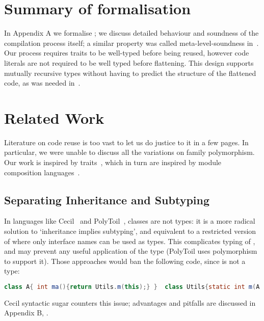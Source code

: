 \saveSpace
\section{Summary of formalisation}
\saveSpace
In Appendix A we formalise \name;  we 
discuss detailed behaviour and soundness
of the compilation process itself;
a similar property was called meta-level-soundness in~\cite{servetto2014meta}.
Our process requires traits to be well-typed before being reused,
however code literals are not required to be well typed before flattening.
This design supports mutually recursive types without having to
predict the structure of the flattened code, as was
needed in~\cite{deep}.

\saveSpace
\section{Related Work}
\saveSpace
Literature on code reuse is too vast to let us do justice to it in a few pages.
In particular, we were unable to discuss all the variations on family polymorphism.
Our work is inspired by traits~\cite{ducasse2006traits}, which in turn
are inspired by module composition languages~\cite{ancona2002calculus}.

\subsection{Separating Inheritance and Subtyping}
In languages like Cecil~\cite{chambers1995typechecking} and PolyToil~\cite{bruce1995polytoil},
classes are not types: it is a more radical solution to `inheritance implies subtyping', and equivalent to a restricted version of \name where only interface names can be used as types.
This complicates typing of \Q@this@,
and may prevent any useful application of the \Q@This@ type (PolyToil uses polymorphism to support it).
Those approaches would ban the following code,
since \Q@A@ is not a type:
\saveSpace\saveSpace\begin{lstlisting}[language=Java]
class A{ int ma(){return Utils.m(this);} }  class Utils{static int m(A a){..}}
\end{lstlisting}\saveSpace\saveSpace
Cecil syntactic sugar counters this issue; advantages and pitfalls are discussed in Appendix B, .


